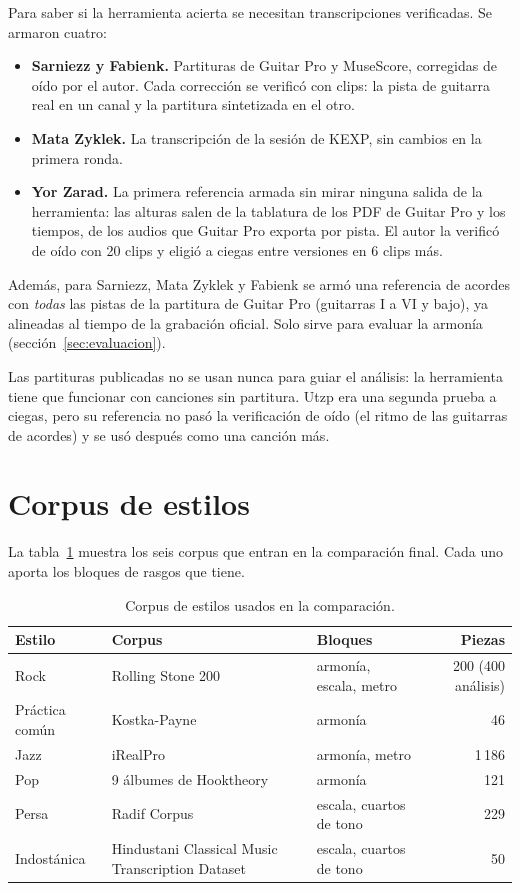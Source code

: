 Para saber si la herramienta acierta se necesitan transcripciones verificadas. Se armaron cuatro:

\begin{itemize}
  \item \textbf{Sarniezz y Fabienk.} Partituras de Guitar Pro y MuseScore, corregidas de oído por el autor. Cada
  corrección se verificó con clips: la pista de guitarra real en un canal y la partitura sintetizada en el otro.
  \item \textbf{Mata Zyklek.} La transcripción de la sesión de KEXP, sin cambios en la primera ronda.
  \item \textbf{Yor Zarad.} La primera referencia armada sin mirar ninguna salida de la herramienta: las alturas salen de
  la tablatura de los PDF de Guitar Pro y los tiempos, de los audios que Guitar Pro exporta por pista. El autor la
  verificó de oído con 20 clips y eligió a ciegas entre versiones en 6 clips más.
\end{itemize}

Además, para Sarniezz, Mata Zyklek y Fabienk se armó una referencia de acordes con \emph{todas} las pistas de la partitura
de Guitar Pro (guitarras I a VI y bajo), ya alineadas al tiempo de la grabación oficial. Solo sirve para evaluar la
armonía (sección~\ref{sec:evaluacion}).

Las partituras publicadas no se usan nunca para guiar el análisis: la herramienta tiene que funcionar con canciones sin
partitura. Utzp era una segunda prueba a ciegas, pero su referencia no pasó la verificación de oído (el ritmo de las
guitarras de acordes) y se usó después como una canción más.

\section{Corpus de estilos}\label{sec:corpus}

La tabla~\ref{tab:corpus} muestra los seis corpus que entran en la comparación final. Cada uno aporta los bloques de
rasgos que tiene.

\begin{table}[ht]
  \centering\small
  \caption{Corpus de estilos usados en la comparación.}\label{tab:corpus}
  \begin{tabularx}{\textwidth}{@{}l>{\raggedright}Xlr@{}}
    \toprule
    Estilo & Corpus & Bloques & Piezas \\
    \midrule
    Rock & Rolling Stone 200 \citep{declercq2011} & armonía, escala, metro & 200 (400 análisis) \\
    Práctica común & Kostka-Payne \citep{temperley2009} & armonía & 46 \\
    Jazz & iRealPro \citep{irealpro} & armonía, metro & 1\,186 \\
    Pop & 9 álbumes de Hooktheory & armonía & 121 \\
    Persa & Radif Corpus \citep{kanani2025} & escala, cuartos de tono & 229 \\
    Indostánica & Hindustani Classical Music Transcription Dataset \citep{singh2022} & escala, cuartos de tono & 50 \\
    \bottomrule
  \end{tabularx}
\end{table}

